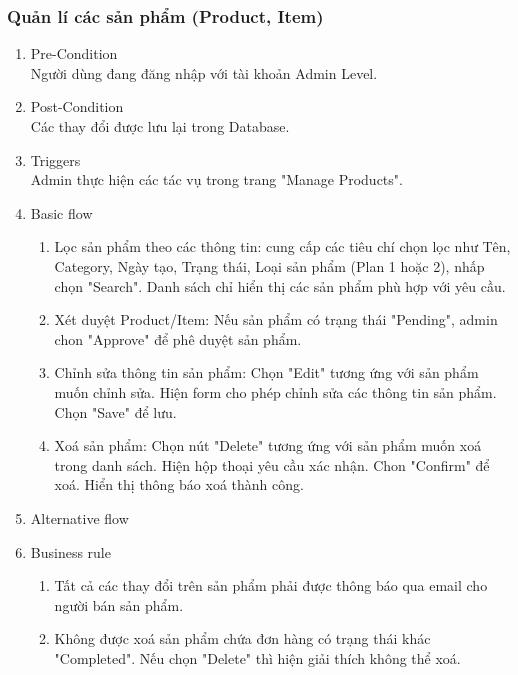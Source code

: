 \subsubsection{Quản lí các sản phẩm (Product, Item)}
\begin{enumerate}
	\item Pre-Condition\\
	Người dùng đang đăng nhập với tài khoản Admin Level.
	\item Post-Condition\\
	Các thay đổi được lưu lại trong Database.
	\item Triggers\\
	Admin thực hiện các tác vụ trong trang "Manage Products".
	\item Basic flow
	\begin{enumerate}
		\item Lọc sản phẩm theo các thông tin: cung cấp các tiêu chí chọn lọc như Tên, Category, Ngày tạo, Trạng thái, Loại sản phẩm (Plan 1 hoặc 2), nhấp chọn "Search". Danh sách chỉ hiển thị các sản phẩm phù hợp với yêu cầu. 
		\item Xét duyệt Product/Item: Nếu sản phẩm có trạng thái "Pending", admin chon "Approve" để phê duyệt sản phẩm. 
		\item Chỉnh sửa thông tin sản phẩm: Chọn "Edit" tương ứng với sản phẩm muốn chỉnh sửa. Hiện form cho phép chỉnh sửa các thông tin sản phẩm. Chọn "Save" để lưu.
		\item Xoá sản phẩm: Chọn nút "Delete" tương ứng với sản phẩm muốn xoá trong danh sách. Hiện hộp thoại yêu cầu xác nhận. Chon "Confirm" để xoá. Hiển thị thông báo xoá thành công.
	\end{enumerate}
	\item Alternative flow
	\item Business rule
	\begin{enumerate}
		\item Tất cả các thay đổi trên sản phẩm phải được thông báo qua email cho người bán sản phẩm.
		\item Không được xoá sản phẩm chứa đơn hàng có trạng thái khác "Completed". Nếu chọn "Delete" thì hiện giải thích không thể xoá.
	\end{enumerate}
\end{enumerate}

